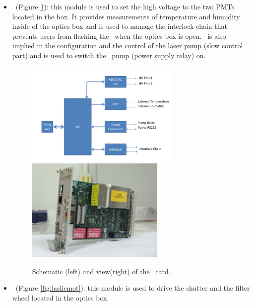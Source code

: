 \begin{itemize}

\item \licpmt~(Figure \ref{fig:laslicpmt}): this module is used to set the high voltage to the two PMTs located in the box. It provides measurements of temperature and humidity inside of the optics box and is used to manage the interlock chain that prevents users from flashing the \laser~when the optics box is open. \licpmt~is also implied in the configuration and the control of the laser pump (slow control part) and is used to switch the \laser~pump (power supply relay) on. 

\begin{figure}[htbp]
\centering
\includegraphics[height=5cm]{figures/licpmt_scheme.pdf}
\includegraphics[height=5cm]{figures/licpmt.JPG}
\caption{Schematic (left) and view(right) of the \licpmt~card.}\label{fig:laslicpmt}
\end{figure}

\item \licmot~(Figure \ref{fig:laslicmot}): this module is used to drive the shutter and the filter wheel located in the optics box. 


\end{itemize}
